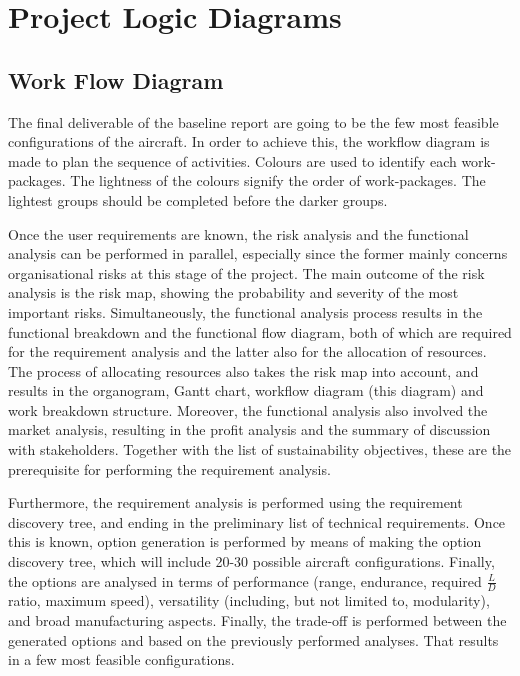 \chapter{Project Logic Diagrams}


\section{Work Flow Diagram}
The final deliverable of the baseline report are going to be the few most feasible configurations of the aircraft. In order to achieve this, the workflow diagram is made to plan the sequence of activities. Colours are used to identify each work-packages. The lightness of the colours signify the order of work-packages. The lightest groups should be completed before the darker groups.

Once the user requirements are known, the risk analysis and the functional analysis can be performed in parallel, especially since the former mainly concerns organisational risks at this stage of the project. The main outcome of the risk analysis is the risk map, showing the probability and severity of the most important risks. Simultaneously, the functional analysis process results in the functional breakdown and the functional flow diagram, both of which are required for the requirement analysis and the latter also for the allocation of resources. The process of allocating resources also takes the risk map into account, and results in the organogram, Gantt chart, workflow diagram (this diagram) and work breakdown structure. Moreover, the functional analysis also involved the market analysis, resulting in the profit analysis and the summary of discussion with stakeholders. Together with the list of sustainability objectives, these are the prerequisite for performing the requirement analysis.

Furthermore, the requirement analysis is performed using the requirement discovery tree, and ending in the preliminary list of technical requirements. Once this is known, option generation is performed by means of making the option discovery tree, which will include 20-30 possible aircraft configurations. Finally, the options are analysed in terms of performance (range, endurance, required $\frac{L}{D}$ ratio, maximum speed), versatility (including, but not limited to, modularity), and broad manufacturing aspects. Finally, the trade-off is performed between the generated options and based on the previously performed analyses. That results in a few most feasible configurations.

